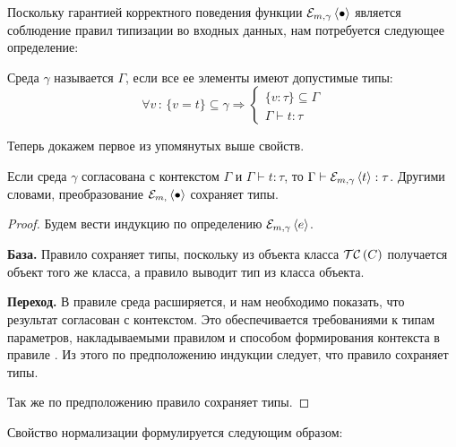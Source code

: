 Поскольку гарантией корректного поведения функции $\mathcal{E}_{m, \gamma} \left\langle \bullet \right\rangle$ является соблюдение правил типизации во входных данных, нам потребуется следующее определение:
\begin{Def}\label{agree}
Среда $\gamma$ называется  $\Gamma$, если все ее элементы имеют допустимые типы:
$$
	\forall v \, : \, 
		\{v = t\} \subseteq \gamma 
			\Rightarrow 
		\left\{\begin{array}{l}		
		\{v : \tau\} \subseteq \Gamma \\
		\Gamma \vdash t : \tau
		\end{array}\right.
$$
\end{Def}
%
Теперь докажем первое из упомянутых выше свойств.

\begin{Th}\label{ThTP}
Если среда $\gamma$ согласована с контекстом $\Gamma$ и \mbox{$\Gamma \vdash t : \tau$}, то \mbox{$\Gamma \vdash \mathcal{E}_{m, \gamma} \left\langle t \right\rangle : \tau$}. Другими словами, преобразование $\mathcal{E}_{m, } \left\langle \bullet \right\rangle$ сохраняет типы.
\end{Th}
\begin{proof}
Будем вести индукцию по определению $\mathcal{E}_{m, \gamma} \left\langle e \right\rangle$.

\noindent\textbf{База.} Правило  сохраняет типы, поскольку из объекта класса $\mathcal{TC}\left(C\right)$ получается объект того же класса, а правило  выводит тип из класса объекта.

\noindent\textbf{Переход.} 
В правиле  среда расширяется, и нам необходимо показать, что результат согласован с контекстом. Это обеспечивается требованиями к типам параметров, накладываемыми правилом  и способом формирования контекста в правиле . Из этого по предположению индукции следует, что правило  сохраняет типы.

Так же по предположению правило  сохраняет типы.
\end{proof}

Свойство нормализации формулируется следующим образом:

